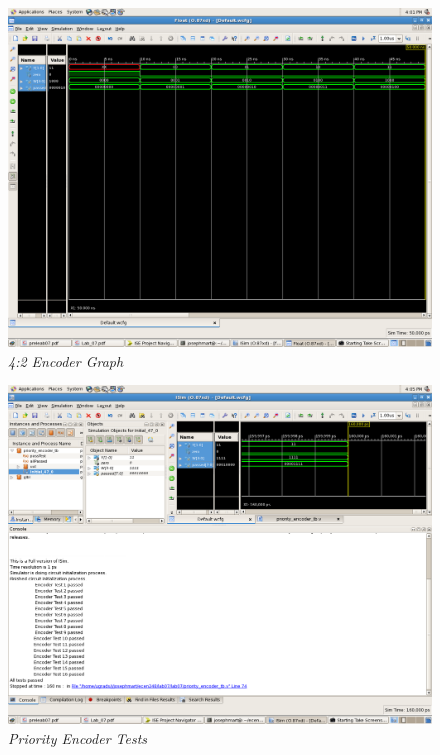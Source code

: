\documentclass[a4paper,12pt]{article}
\begin{document}
  \newpage

  \begin{figure}[h]
    \begin{center}
      \includegraphics[scale=0.18]{2_2_2.png}
      \caption{\textit{4:2 Encoder Graph}}
    \end{center}
  \end{figure}

  \begin{figure}[h]
    \begin{center}
      \includegraphics[scale=0.18]{2_3_1.png}
      \caption{\textit{Priority Encoder Tests}}
    \end{center}
  \end{figure}
\end{document}
